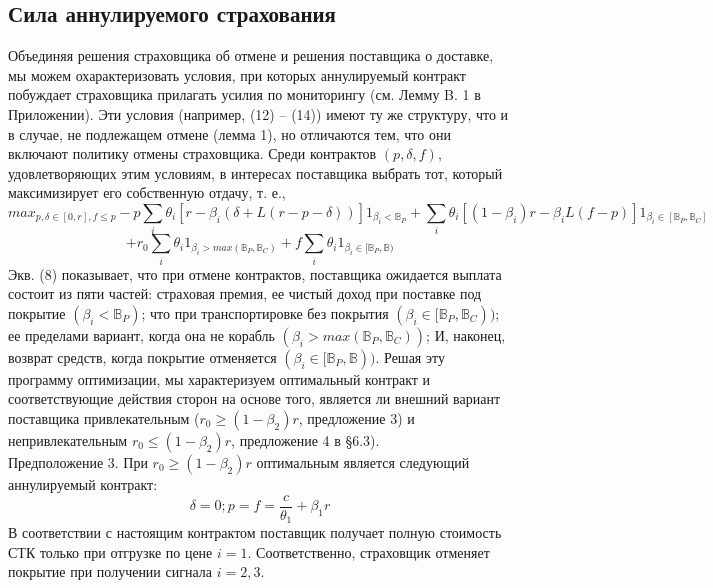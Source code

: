 \documentclass[a4paper,12pt]{article}
\begin{document}
\subsection{Сила аннулируемого страхования}
Объединяя решения страховщика об отмене и решения поставщика о доставке, мы можем охарактеризовать условия, при которых аннулируемый контракт побуждает страховщика прилагать усилия по мониторингу (см. Лемму B. 1 в Приложении). Эти условия (например, (12) – (14)) имеют ту же структуру, что и в случае, не подлежащем отмене (лемма 1), но отличаются тем, что они включают политику отмены страховщика. Среди контрактов $(p,\delta,f)$, удовлетворяющих этим условиям, в интересах поставщика выбрать тот, который максимизирует его собственную отдачу, т. е.,
\begin{equation}
	max_{p,\delta \in [0,r], f \leq p} - p\sum_{i}\theta_{i}[r - \beta_{i}(\delta+L(r-p-\delta))]1_{\beta_{i}<\mathbb{B}_{P}}+\sum_{i}\theta_{i}[(1 - \beta_{i})r - \beta_{i}L(f-p)]1_{\beta_{i} \in [\mathbb{B}_{P}, \mathbb{B}_{C}]}
\end{equation}
\[
	+ r_{0}\sum_{i}\theta_{i}1_{\beta_{i}>max(\mathbb{B}_{P}, \mathbb{B}_{C})}
	 + f\sum_{i}\theta_{i}1_{\beta_{i} \in [\mathbb{B}_{P}, \mathbb{B})}
\]
Экв. (8) показывает, что при отмене контрактов, поставщика ожидается выплата состоит из пяти частей: страховая премия, ее чистый доход при поставке под покрытие $(\beta_{i} < \mathbb{B}_{P})$; что при транспортировке без покрытия $(\beta_{i} \in [\mathbb{B}_{P}, \mathbb{B}_{C}))$; ее пределами вариант, когда она не корабль $(\beta_{i} > max(\mathbb{B}_{P}, \mathbb{B}_{C}))$; И, наконец, возврат средств, когда покрытие отменяется $(\beta_{i} \in [\mathbb{B}_{P}, \mathbb{B}))$.
Решая эту программу оптимизации, мы характеризуем оптимальный контракт и соответствующие действия сторон на основе того, является ли внешний вариант поставщика привлекательным ($r_{0} \geq (1-\beta_{2})r$, предложение 3) и непривлекательным $r_{0} \leq (1-\beta_{2})r$, предложение 4 в §6.3).
\\
Предположение 3. При $r_{0} \geq (1-\beta_{2})r$ оптимальным является следующий аннулируемый контракт:
\\
\begin{equation}
	\delta=0; p=f=\frac{c}{\theta_{1}}+\beta_{1}r
\end{equation}
В соответствии с настоящим контрактом поставщик получает полную стоимость СТК только при отгрузке по цене $i = 1$. Соответственно, страховщик отменяет покрытие при получении сигнала $i = 2, 3$.
\\
\end{document}
